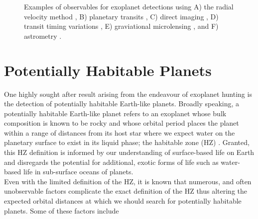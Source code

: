 \begin{figure}
  \centering
  \caption{Examples of observables for exoplanet detections using A)
    the radial velocity method \citep{mayor95}, B) planetary transits
    \citep{charbonneau09}, C) direct imaging \citep{currie14},
    D) transit timing variations \citep{ballard11},
    E) graviational microlensing \citep{beaulieu06}, and
    F) astrometry \citep{sahlmann13}.}
  \label{fig:detection}
\end{figure}


\iffalse
\section{Potentially Habitable Planets} \label{sect:HZ}
One highly sought after result arising from the endeavour of exoplanet hunting 
is the detection of potentially habitable Earth-like planets. 
Broadly speaking, a potentially habitable Earth-like planet refers to 
an exoplanet whose bulk composition is known to be rocky and whose 
orbital period places the planet within a range of distances from its host star 
where we expect water on the planetary surface to exist in its liquid phase; 
the habitable zone (HZ) \citep{dole64, hart79}. Granted, this HZ 
definition is 
informed by our understanding of surface-based life on Earth and disregards 
the potential for additional, exotic forms of life such as water-based life 
in sub-surface oceans of planets. \\

Even with the limited definition of the 
HZ, it is known that numerous, and often unobservable factors complicate the 
exact definition of the HZ thus altering the expected orbital 
distances at which we should search for potentially habitable planets. 
Some of these factors include 

